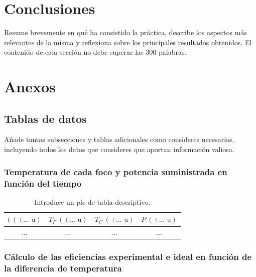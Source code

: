 
\section{Conclusiones}

Resume brevemente en qué ha consistido la práctica, describe los aspectos más relevantes de la misma y reflexiona sobre los principales resultados obtenidos. El contenido de esta sección no debe superar las 300 palabras.

\section{Anexos}

\subsection{Tablas de datos}

Añade tantas subsecciones y tablas adicionales como consideres necesarias, incluyendo todos los datos que consideres que aportan información valiosa.

\newpage %

\subsubsection{Temperatura de cada foco y potencia suministrada en función del tiempo}

\begin{table}[ht!]
    \centering
    \begin{tabular}{c|c|c|c}
     $t\ (\pm ...\text{ u})$ & $T_{F}\ (\pm ...\text{ u})$ & $T_{C}\ (\pm ...\text{ u})$ & $P\ (\pm ...\text{ u})$ \\
    \hline
    ... & ... & ... & ... \\
    \hline
    \end{tabular}
    \caption{Introduce un pie de tabla descriptivo.}
    \label{tab:t-T-P}
\end{table}

\subsubsection{Cálculo de las eficiencias experimental e ideal en función de la diferencia de temperatura}

